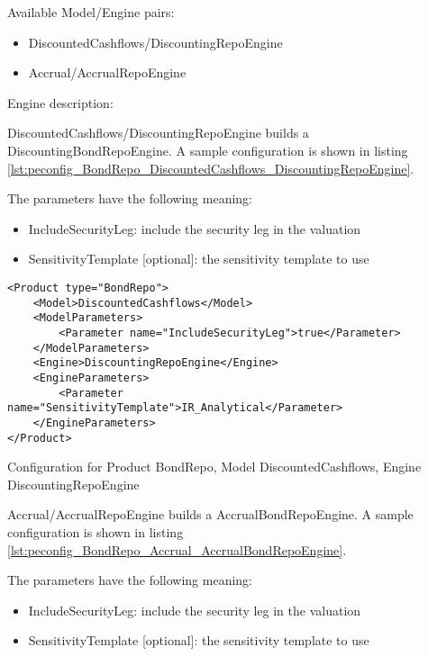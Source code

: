 Available Model/Engine pairs:

\begin{itemize}
\item DiscountedCashflows/DiscountingRepoEngine
\item Accrual/AccrualRepoEngine
\end{itemize}

Engine description:

DiscountedCashflows/DiscountingRepoEngine builds a DiscountingBondRepoEngine. A sample configuration is shown in listing
\ref{lst:peconfig_BondRepo_DiscountedCashflows_DiscountingRepoEngine}.

The parameters have the following meaning:

\begin{itemize}
\item IncludeSecurityLeg: include the security leg in the valuation
\item SensitivityTemplate [optional]: the sensitivity template to use 
\end{itemize}

\begin{longlisting}
\begin{verbatim}
<Product type="BondRepo">
    <Model>DiscountedCashflows</Model>
    <ModelParameters>
        <Parameter name="IncludeSecurityLeg">true</Parameter>
    </ModelParameters>
    <Engine>DiscountingRepoEngine</Engine>
    <EngineParameters>
        <Parameter name="SensitivityTemplate">IR_Analytical</Parameter>
    </EngineParameters>
</Product>
\end{verbatim}
\caption{Configuration for Product BondRepo, Model DiscountedCashflows, Engine DiscountingRepoEngine}
\label{lst:peconfig_BondRepo_DiscountedCashflows_DiscountingRepoEngine}
\end{longlisting}

Accrual/AccrualRepoEngine builds a AccrualBondRepoEngine. A sample configuration is shown in listing
\ref{lst:peconfig_BondRepo_Accrual_AccrualBondRepoEngine}.

The parameters have the following meaning:

\begin{itemize}
\item IncludeSecurityLeg: include the security leg in the valuation
\item SensitivityTemplate [optional]: the sensitivity template to use 
\end{itemize}

